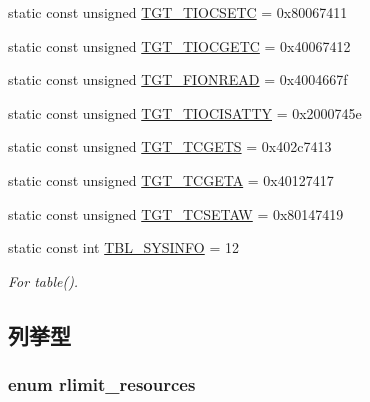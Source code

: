 \begin{Indent}{\bf }
\begin{DoxyCompactItemize}
static const unsigned \hyperlink{classAlphaTru64_a98595955a801e37d1d5be450c203afe5}{TGT\_\-TIOCSETC} = 0x80067411
\item 
static const unsigned \hyperlink{classAlphaTru64_ad4f95fbdb4f52f68481c247267675007}{TGT\_\-TIOCGETC} = 0x40067412
\item 
static const unsigned \hyperlink{classAlphaTru64_a1def346ff527c8efccfd52463f3b5dc1}{TGT\_\-FIONREAD} = 0x4004667f
\item 
static const unsigned \hyperlink{classAlphaTru64_a0b4908f73bde5fcd2ce5ea35f6c3786f}{TGT\_\-TIOCISATTY} = 0x2000745e
\item 
static const unsigned \hyperlink{classAlphaTru64_a50e5d880569ec2cb9a2f3d4aaa55cc64}{TGT\_\-TCGETS} = 0x402c7413
\item 
static const unsigned \hyperlink{classAlphaTru64_a804fc265279c5dbd78e0f95da998b267}{TGT\_\-TCGETA} = 0x40127417
\item 
static const unsigned \hyperlink{classAlphaTru64_a96e06e042526ea5e89c4e8a020636c52}{TGT\_\-TCSETAW} = 0x80147419
\item 
static const int \hyperlink{classAlphaTru64_a02a979126f2aa34bcdfdc6ab92207d3b}{TBL\_\-SYSINFO} = 12
\begin{DoxyCompactList}\small\item\em For table(). \item\end{DoxyCompactList}\end{DoxyCompactItemize}
\end{Indent}


\subsection{列挙型}
\hypertarget{classAlphaTru64_a599454267926920de3bd5a488bda3e03}{
\subsubsection[{rlimit\_\-resources}]{\setlength{\rightskip}{0pt plus 5cm}enum {\bf rlimit\_\-resources}}}
\label{classAlphaTru64_a599454267926920de3bd5a488bda3e03}


